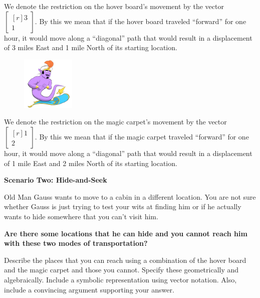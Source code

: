 \documentclass{problemset}
\newcommand{\mat}[1]{\begin{bmatrix*}[r]#1\end{bmatrix*}}
\begin{document}
\begin{iola}
\begin{minipage}{\textwidth}
	We denote the restriction on the hover board's movement by the vector
	$\mat{3 \\1}$. By this we mean that if
	the hover board traveled ``forward'' for one hour, it would move along a
	``diagonal'' path that would result in a displacement of 3 miles East and
	1 mile North of its starting location.
\end{minipage}

\begin{minipage}{\textwidth}
	\vspace{.5cm}
	\begin{figure}
	\vspace{-.8cm}
	\includegraphics[width=1in]{images/MagicCarpet-small.png}
	\end{figure}

	We denote the restriction on the magic carpet's movement by the vector
	$\mat{1 \\2 }$. By this we mean that if the
	magic carpet traveled ``forward'' for one hour, it would move along a
	``diagonal'' path that would result in a displacement of 1 mile East and
	2 miles North of its starting location.
	\vspace{1cm}
\end{minipage}



\textbf{Scenario Two: Hide-and-Seek}

Old Man Gauss wants to move to a cabin in a different location. You are
not sure whether Gauss is just trying to test your wits at finding him
or if he actually wants to hide somewhere that you can't visit him.

\vspace{5mm}

\textbf{Are there some locations that he can hide and you cannot reach him
with these two modes of transportation?}

Describe the places that you
can reach using a combination of the hover board and the magic carpet and
those you cannot. Specify these geometrically and algebraically. Include
a symbolic representation using vector notation. Also, include a convincing
argument supporting your answer.

\end{iola}
\end{document}
